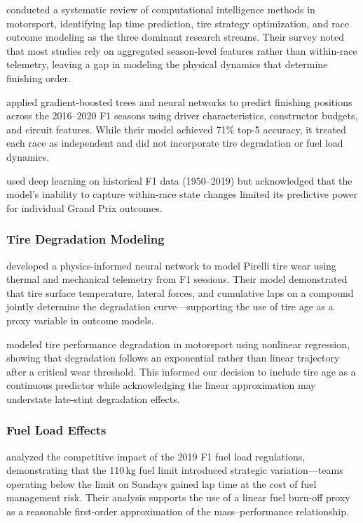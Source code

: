 \textcite{fister2021} conducted a systematic review of computational
intelligence methods in motorsport, identifying lap time prediction, tire
strategy optimization, and race outcome modeling as the three dominant
research streams. Their survey noted that most studies rely on aggregated
season-level features rather than within-race telemetry, leaving a gap in
modeling the physical dynamics that determine finishing order.

\textcite{kuhn2022f1} applied gradient-boosted trees and neural networks to
predict finishing positions across the 2016--2020 F1 seasons using driver
characteristics, constructor budgets, and circuit features. While their model
achieved 71\% top-5 accuracy, it treated each race as independent and did not
incorporate tire degradation or fuel load dynamics.

\textcite{song2020} used deep learning on historical F1 data (1950--2019) but
acknowledged that the model's inability to capture within-race state changes
limited its predictive power for individual Grand Prix outcomes.

\subsubsection{Tire Degradation Modeling}

\textcite{perdomo2021tire} developed a physics-informed neural network to
model Pirelli tire wear using thermal and mechanical telemetry from F1
sessions. Their model demonstrated that tire surface temperature, lateral
forces, and cumulative laps on a compound jointly determine the degradation
curve---supporting the use of tire age as a proxy variable in outcome models.

\textcite{baldi2022} modeled tire performance degradation in motorsport using
nonlinear regression, showing that degradation follows an exponential rather
than linear trajectory after a critical wear threshold. This informed our
decision to include tire age as a continuous predictor while acknowledging
the linear approximation may understate late-stint degradation effects.

\subsubsection{Fuel Load Effects}

\textcite{oldknow2022fuel} analyzed the competitive impact of the 2019 F1 fuel
load regulations, demonstrating that the 110\,kg fuel limit introduced
strategic variation---teams operating below the limit on Sundays gained lap
time at the cost of fuel management risk. Their analysis supports the use of a
linear fuel burn-off proxy as a reasonable first-order approximation of the
mass--performance relationship.

